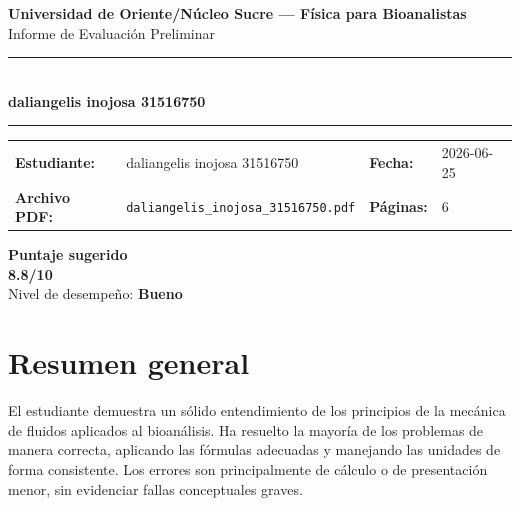 \documentclass[11pt,a4paper]{article}
\begin{document}
\begin{center}
  {\Large\bfseries\color{azulTitulo} Universidad de Oriente/Núcleo Sucre --- Física para Bioanalistas}\\[4pt]
  {\large Informe de Evaluación Preliminar}\\[12pt]
  \rule{\linewidth}{1.2pt}\\[6pt]
  {\LARGE\bfseries daliangelis inojosa 31516750}\\[4pt]
  \rule{\linewidth}{0.6pt}
\end{center}

\vspace{4pt}
\begin{tcolorbox}[cajaTitulo, title=Datos del informe]
\begin{tabular}{@{}llll@{}}
  \textbf{Estudiante:}  & daliangelis inojosa 31516750  &
  \textbf{Fecha:}       & 2026-06-25 \\[4pt]
  \textbf{Archivo PDF:} & \texttt{daliangelis\_inojosa\_31516750.pdf}  &
  \textbf{Páginas:}     & 6 \\
\end{tabular}
\end{tcolorbox}

\vspace{6pt}
\begin{center}
  \begin{tcolorbox}[
    enhanced,
    colback=white, colframe=desempeno_bueno,
    width=0.62\linewidth,
    boxrule=2pt,
    halign=center, valign=center,
    top=8pt, bottom=8pt,
  ]
    \centering
    {\large\bfseries Puntaje sugerido}\\[6pt]
    {\Huge\bfseries\color{desempeno_bueno} 8.8/10}\\[6pt]
    {\large Nivel de desempeño: \textbf{\color{desempeno_bueno} Bueno}}
  \end{tcolorbox}
\end{center}

\section*{Resumen general}
El estudiante demuestra un sólido entendimiento de los principios de la mecánica de fluidos aplicados al bioanálisis. Ha resuelto la mayoría de los problemas de manera correcta, aplicando las fórmulas adecuadas y manejando las unidades de forma consistente. Los errores son principalmente de cálculo o de presentación menor, sin evidenciar fallas conceptuales graves.
\end{document}
